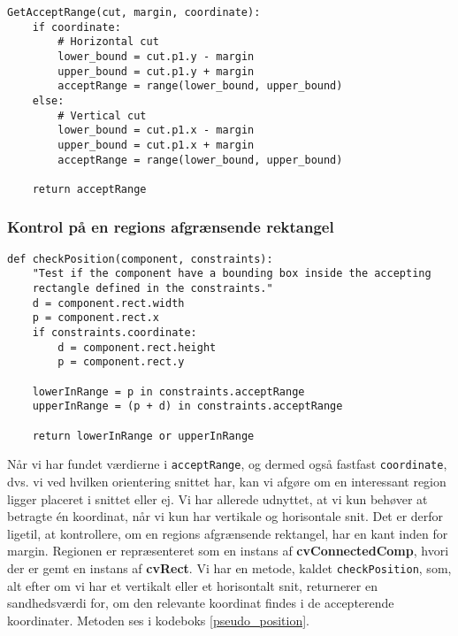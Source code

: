 {\begin{lstlisting}[caption={Metode som genererer sættet af accepterende
    koordinater.},captionpos=b,label={pseudo_acceptRange},
    frame=tb, breaklines=false, float=b]
GetAcceptRange(cut, margin, coordinate):
    if coordinate:
        # Horizontal cut
        lower_bound = cut.p1.y - margin
        upper_bound = cut.p1.y + margin
        acceptRange = range(lower_bound, upper_bound)
    else:
        # Vertical cut
        lower_bound = cut.p1.x - margin
        upper_bound = cut.p1.x + margin
        acceptRange = range(lower_bound, upper_bound)

    return acceptRange
\end{lstlisting}

\subsubsection{Kontrol på en regions afgrænsende rektangel}
\begin{lstlisting}[caption={Metode, som kontrollerer, hvorvidt en region
    har en kant af det afgrænsende rektangel inden for margin.},
    captionpos=b, label={pseudo_position}, frame=tb, breaklines=false,
    float=t]
def checkPosition(component, constraints):
    "Test if the component have a bounding box inside the accepting
    rectangle defined in the constraints."
    d = component.rect.width
    p = component.rect.x
    if constraints.coordinate:
        d = component.rect.height
        p = component.rect.y

    lowerInRange = p in constraints.acceptRange
    upperInRange = (p + d) in constraints.acceptRange

    return lowerInRange or upperInRange
\end{lstlisting}
Når vi har fundet værdierne i \texttt{acceptRange}, og dermed også
fastfast \texttt{coordinate}, dvs. vi ved hvilken orientering snittet
har, kan vi afgøre om en interessant region ligger placeret i snittet
eller ej. Vi har allerede udnyttet, at vi kun behøver at betragte én
koordinat, når vi kun har vertikale og horisontale snit. Det er derfor
ligetil, at kontrollere, om en regions afgrænsende rektangel, har en
kant inden for margin. Regionen er repræsenteret som en instans af
\textbf{cvConnectedComp}, hvori der er gemt en instans af
\textbf{cvRect}. Vi har en metode, kaldet \texttt{checkPosition}, som,
alt efter om vi har et vertikalt eller et horisontalt snit, returnerer
en sandhedsværdi for, om den relevante koordinat findes i de
accepterende koordinater. Metoden ses i kodeboks \ref{pseudo_position}.

}
